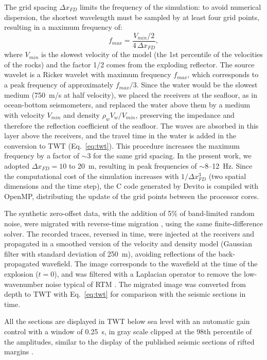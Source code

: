 The grid spacing $\Delta x_{FD}$ limits the frequency of the simulation: to avoid numerical
dispersion, the shortest wavelength must be sampled by at least four grid points, resulting in
a maximum frequency of:
\begin{equation}
  f_{max} = \frac{V_{min} / 2}{4\, \Delta x_{FD}},
  \label{eq:fmax}
\end{equation}
where $V_{min}$ is the slowest velocity of the model (the 1st percentile of the velocities of
the rocks) and the factor 1/2 comes from the exploding reflector. The source wavelet is a
Ricker wavelet with maximum frequency $f_{max}$, which corresponds to a peak frequency of
approximately $f_{max}/3$. Since the water would be the slowest medium (750~m/s at half
velocity), we placed the receivers at the seafloor, as in ocean-bottom seismometers, and
replaced the water above them by a medium with velocity $V_{min}$ and density
$\rho_w V_w / V_{min}$, preserving the impedance and therefore the reflection coefficient of
the seafloor. The waves are absorbed in this layer above the receivers, and the travel time in
the water is added in the conversion to TWT (Eq.~\ref{eq:twt}). This procedure increases the
maximum frequency by a factor of $\sim$3 for the same grid spacing. In the present work, we
adopted $\Delta x_{FD} = 10$ to 20~m, resulting in peak frequencies of $\sim$8--12~Hz.
Since the computational cost of the simulation increases with $1/\Delta x_{FD}^3$ (two
spatial dimensions and the time step), the C code generated by Devito is compiled with
OpenMP, distributing the update of the grid points between the processor cores.

The synthetic zero-offset data, with the addition of 5\% of band-limited random noise, were
migrated with reverse-time migration \citep[RTM;][]{Baysal1983}, using the same
finite-difference solver. The recorded traces, reversed in time, were injected at the
receivers and propagated in a smoothed version of the velocity and density model (Gaussian
filter with standard deviation of 250~m), avoiding reflections of the back-propagated
wavefield. The image corresponds to the wavefield at the time of the explosion
($t = 0$), and was filtered with a Laplacian operator to remove the low-wavenumber noise
typical of RTM \citep{Zhang2009}. The migrated image was converted from depth to TWT with
Eq.~\ref{eq:twt} for comparison with the seismic sections in time.

All the sections are displayed in TWT below sea level with an automatic gain control
\citep{Yilmaz2001} with a window of 0.25~s, in gray scale clipped at the 98th percentile of
the amplitudes, similar to the display of the published seismic sections of rifted margins
\citep[e.g.][]{Gillard2015, Gillard2016b}.

